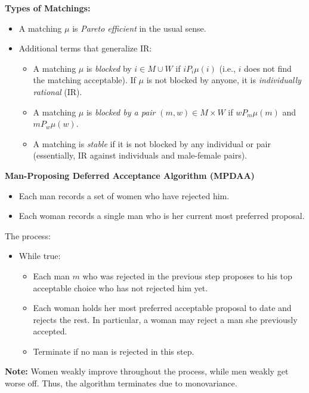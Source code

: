 \documentclass[8pt]{scrartcl}
\begin{document}
\begin{multicols*}{2}
\textbf{Types of Matchings:}
\begin{itemize}
    \item A matching $\mu$ is \textit{Pareto efficient} in the usual sense.
    \item Additional terms that generalize IR:
    \begin{itemize}
        \item A matching $\mu$ is \textit{blocked} by $i \in M \cup W$ if $i P_i \mu(i)$ (i.e., $i$ does not find the matching acceptable). If $\mu$ is not blocked by anyone, it is \textit{individually rational} (IR).
        \item A matching $\mu$ is \textit{blocked by a pair} $(m, w) \in M \times W$ if $w P_m \mu(m)$ and $m P_w \mu(w)$.
        \item A matching is \textit{stable} if it is not blocked by any individual or pair (essentially, IR against individuals and male-female pairs).
    \end{itemize}
\end{itemize}

    \textbf{Man-Proposing Deferred Acceptance Algorithm (MPDAA)}

\begin{itemize}
    \item Each man records a set of women who have rejected him.
    \item Each woman records a single man who is her current most preferred proposal.
\end{itemize}

The process:
\begin{itemize}
    \item While true:
    \begin{itemize}
        \item Each man $m$ who was rejected in the previous step proposes to his top acceptable choice who has not rejected him yet.
        \item Each woman holds her most preferred acceptable proposal to date and rejects the rest. In particular, a woman may reject a man she previously accepted.
        \item Terminate if no man is rejected in this step.
    \end{itemize}
\end{itemize}

\textbf{Note:} Women weakly improve throughout the process, while men weakly get worse off. Thus, the algorithm terminates due to monovariance.


\end{multicols*}
\end{document}
